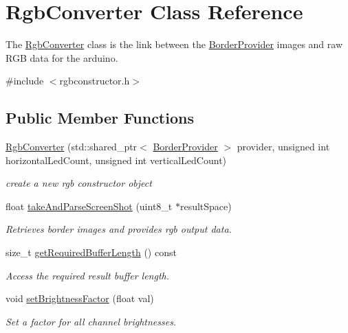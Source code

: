 \hypertarget{classRgbConverter}{}\section{Rgb\+Converter Class Reference}
\label{classRgbConverter}


The \hyperlink{classRgbConverter}{Rgb\+Converter} class is the link between the \hyperlink{classBorderProvider}{Border\+Provider} images and raw R\+GB data for the arduino.  




{\ttfamily \#include $<$rgbconstructor.\+h$>$}

\subsection*{Public Member Functions}
\begin{DoxyCompactItemize}
\item 
\hyperlink{classRgbConverter_a1a88728db70b694de8702716d3f4f0e8}{Rgb\+Converter} (std\+::shared\+\_\+ptr$<$ \hyperlink{classBorderProvider}{Border\+Provider} $>$ provider, unsigned int horizontal\+Led\+Count, unsigned int vertical\+Led\+Count)
\begin{DoxyCompactList}\small\item\em create a new rgb constructor object \end{DoxyCompactList}\item 
float \hyperlink{classRgbConverter_a37985f601284a5a90e4fee7485085da8}{take\+And\+Parse\+Screen\+Shot} (uint8\+\_\+t $\ast$result\+Space)
\begin{DoxyCompactList}\small\item\em Retrieves border images and provides rgb output data. \end{DoxyCompactList}\item 
size\+\_\+t \hyperlink{classRgbConverter_aa6ad1b8cc5f4a9fa3e7304e1884f9a8c}{get\+Required\+Buffer\+Length} () const 
\begin{DoxyCompactList}\small\item\em Access the required result buffer length. \end{DoxyCompactList}\item 
void \hyperlink{classRgbConverter_a070b03c9ecd6bf1f801403cc4ed99d50}{set\+Brightness\+Factor} (float val)
\begin{DoxyCompactList}\small\item\em Set a factor for all channel brightnesses. \end{DoxyCompactList}\end{DoxyCompactItemize}



